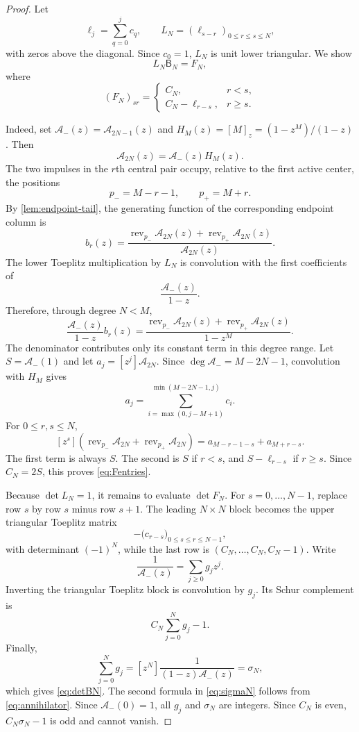 \documentclass[11pt,oneside]{article}
\numberwithin{equation}{section}
\theoremstyle{definition}
\theoremstyle{remark}
\newcommand{\rev}{\operatorname{rev}}
\begin{document}
\begin{proof}
Let
\[
 \ell_j=\sum_{q=0}^{j}c_q,
 \qquad
 L_N=(\ell_{s-r})_{0\le r\le s\le N},
\]
with zeros above the diagonal.  Since $c_0=1$, $L_N$ is unit lower
triangular.  We show
\begin{equation}
 L_N\mathsf B_N=F_N,
 \label{eq:LBF}
\end{equation}
where
\begin{equation}
 (F_N)_{sr}=\begin{cases}
 C_N,&r<s,\\[0.2em]
 C_N-\ell_{r-s},&r\ge s.
 \end{cases}
 \label{eq:Fentries}
\end{equation}

Indeed, set $\mathcal A_-(z)=\mathcal A_{2N-1}(z)$ and
$H_M(z)=[M]_z=(1-z^M)/(1-z)$.  Then
\begin{equation}
 \mathcal A_{2N}(z)=\mathcal A_-(z)H_M(z).
 \label{eq:A-factor-central}
\end{equation}
The two impulses in the $r$th central pair occupy, relative to the first
active center, the positions
\[
 p_-=M-r-1,
 \qquad p_+=M+r.
\]
By \cref{lem:endpoint-tail}, the generating function of the corresponding
endpoint column is
\[
 b_r(z)=\frac{\rev_{p_-}\mathcal A_{2N}(z)
 +\rev_{p_+}\mathcal A_{2N}(z)}{\mathcal A_{2N}(z)}.
\]
The lower Toeplitz multiplication by $L_N$ is convolution with the first
coefficients of
\[
 \frac{\mathcal A_-(z)}{1-z}.
\]
Therefore, through degree $N<M$,
\begin{equation}
 \frac{\mathcal A_-(z)}{1-z}b_r(z)
 =\frac{\rev_{p_-}\mathcal A_{2N}(z)
 +\rev_{p_+}\mathcal A_{2N}(z)}{1-z^M}.
 \label{eq:Lb-generating}
\end{equation}
The denominator contributes only its constant term in this degree range.
Let $S=\mathcal A_-(1)$ and let $a_j=[z^j]\mathcal A_{2N}$.  Since
$\deg\mathcal A_-=M-2N-1$, convolution with $H_M$ gives
\[
 a_j=\sum_{i=\max(0,j-M+1)}^{\min(M-2N-1,j)}c_i.
\]
For $0\le r,s\le N$,
\[
 [z^s](\rev_{p_-}\mathcal A_{2N}
 +\rev_{p_+}\mathcal A_{2N})
 =a_{M-r-1-s}+a_{M+r-s}.
\]
The first term is always $S$.  The second is $S$ if $r<s$, and
$S-\ell_{r-s}$ if $r\ge s$.  Since $C_N=2S$, this proves
\eqref{eq:Fentries}.

Because $\det L_N=1$, it remains to evaluate $\det F_N$.  For
$s=0,\ldots,N-1$, replace row $s$ by row $s$ minus row $s+1$.  The leading
$N\times N$ block becomes the upper triangular Toeplitz matrix
\[
 -\bigl(c_{r-s}\bigr)_{0\le s\le r\le N-1},
\]
with determinant $(-1)^N$, while the last row is
$(C_N,\ldots,C_N,C_N-1)$.  Write
\begin{equation}
 \frac1{\mathcal A_-(z)}=\sum_{j\ge0}g_jz^j.
 \label{eq:g-inverse}
\end{equation}
Inverting the triangular Toeplitz block is convolution by $g_j$.  Its Schur
complement is
\[
 C_N\sum_{j=0}^{N}g_j-1.
\]
Finally,
\[
 \sum_{j=0}^{N}g_j=[z^N]\frac1{(1-z)\mathcal A_-(z)}=\sigma_N,
\]
which gives \eqref{eq:detBN}.  The second formula in \eqref{eq:sigmaN} follows
from \eqref{eq:annihilator}.  Since $\mathcal A_-(0)=1$, all $g_j$ and
$\sigma_N$ are integers.  Since $C_N$ is even, $C_N\sigma_N-1$ is odd and
cannot vanish.
\end{proof}
\end{document}
